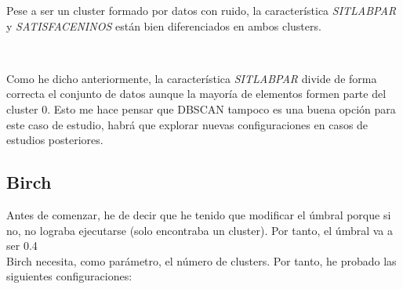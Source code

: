 \documentclass[paper=a4, fontsize=12pt]{article} %
\numberwithin{equation}{section} %
\numberwithin{figure}{section} %
\numberwithin{table}{section} %
\begin{document}
Pese a ser un cluster formado por datos con ruido, la característica \textit{SITLABPAR} y \textit{SATISFACENINOS} están bien diferenciados en ambos clusters.

\begin{figure}[H]
    \centering
    \mbox {
    }
\end{figure}

Como he dicho anteriormente, la característica \textit{SITLABPAR} divide de forma correcta el conjunto de datos aunque la mayoría de elementos formen parte del cluster 0. Esto me hace pensar que DBSCAN tampoco es una buena opción para este caso de estudio, habrá que explorar nuevas configuraciones en casos de estudios posteriores.

\subsection{Birch}
Antes de comenzar, he de decir que he tenido que modificar el úmbral porque si no, no lograba ejecutarse (solo encontraba un cluster). Por tanto, el úmbral va a ser 0.4 \\

Birch necesita, como parámetro, el número de clusters. Por tanto, he probado las siguientes configuraciones:
\end{document}
